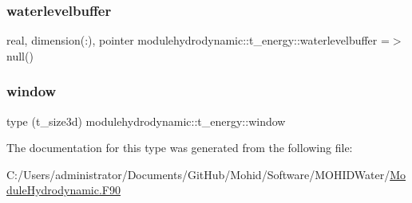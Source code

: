 \mbox{\label{structmodulehydrodynamic_1_1t__energy_a497dca88f2d5d4b76afab1c683d23e4d}} 
\subsubsection{\texorpdfstring{waterlevelbuffer}{waterlevelbuffer}}
{\footnotesize\ttfamily real, dimension(\+:), pointer modulehydrodynamic\+::t\+\_\+energy\+::waterlevelbuffer =$>$ null()\hspace{0.3cm}{\ttfamily [private]}}

\mbox{\label{structmodulehydrodynamic_1_1t__energy_a7759cfb1ad8f97e037ff5f4d1ae44ebe}} 
\subsubsection{\texorpdfstring{window}{window}}
{\footnotesize\ttfamily type (t\+\_\+size3d) modulehydrodynamic\+::t\+\_\+energy\+::window\hspace{0.3cm}{\ttfamily [private]}}



The documentation for this type was generated from the following file\+:\begin{DoxyCompactItemize}
\item 
C\+:/\+Users/administrator/\+Documents/\+Git\+Hub/\+Mohid/\+Software/\+M\+O\+H\+I\+D\+Water/\mbox{\hyperlink{_module_hydrodynamic_8_f90}{Module\+Hydrodynamic.\+F90}}\end{DoxyCompactItemize}
